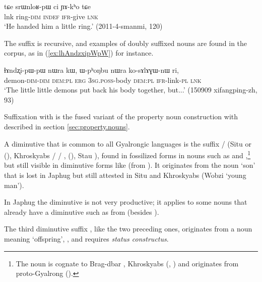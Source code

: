 \begin{exe}
\ex \label{ex:srWnloR}
\gll tɕe srɯnloʁ-pɯ ci ɲɤ-kʰo tɕe \\
lnk ring-\textsc{dim} \textsc{indef} \textsc{ifr}-give \textsc{lnk} \\
\glt `He handed him a little ring.' (2011-4-smanmi, 120)
\end{exe}

The suffix  is recursive, and examples of doubly suffixed nouns are found in the corpus, as in (\ref{ex:lhAndzxipWpW}) for instance. 

\begin{exe}
\ex \label{ex:lhAndzxipWpW}
\gll  ɬɤndʐi-pɯ-pɯ nɯra kɯ, ɯ-pʰoŋbu nɯra ko-sɤlɤɣɯ-nɯ ri, \\
demon-\textsc{dim}-\textsc{dim} \textsc{dem}:\textsc{pl} \textsc{erg} \textsc{3sg}.\textsc{poss}-body \textsc{dem}:\textsc{pl} \textsc{ifr}-link-\textsc{pl} \textsc{lnk} \\
\glt `The little little demons put back his body together, but...' (150909 xifangping-zh, 93)
\end{exe}

Suffixation with  is the fused variant of the property noun construction with  described in section \ref{sec:property.nouns}.

A diminutive that is common to all Gyalrongic languages is the suffix / (Situ  or  (\citealt[163]{linxr93jiarongen}), Khroskyabs  /  / ,  (\citealt[158]{lai17khroskyabs}), Stau ), found in fossilized forms in nouns such as  and ,\footnote{The noun  is cognate to Brag-dbar , Khroskyabs  (\citealt{zhang16bragdbar}, \citealt[156]{lai17khroskyabs}) and originates from proto-Gyalrong  (\citealt[53]{jacques08zh}). } but still visible in diminutive forms like  (from ). It originates from the noun `son' that is lost in Japhug but still attested in Situ and Khroskyabs (Wobzi  `young man'). 

In Japhug the  diminutive is not very productive; it applies to some nouns that already have a  diminutive such as  from  (besides ).

The third diminutive suffix , like the two preceding ones, originates from a noun meaning `offspring', , and requires \textit{status constructus}.

